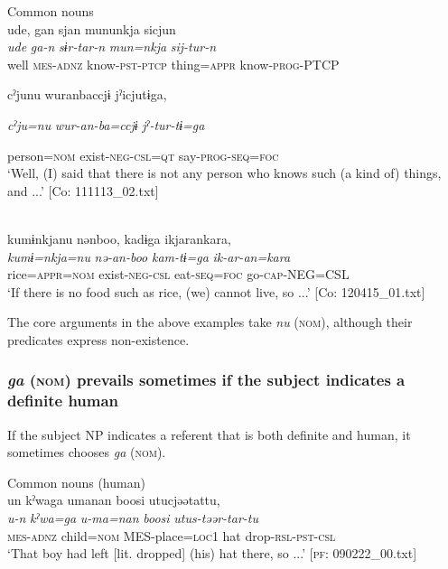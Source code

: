 \begin{table}
\begin{styleBeschriftung}
\ea\label{ex:6-131}
 Common nouns\\

 \ea {\TM}  ude,  gan  sjan  mununkja  sicjun\\
\glll \textit{ude}  \textit{ga-n}  \textit{sɨr-tar-n}  \textit{mun=nkja}  \textit{sij-tur-n}\\
well  \textsc{mes}-\textsc{adnz}  know-\textsc{pst}-\textsc{ptcp}  thing=\textsc{appr}  know-\textsc{prog}-PTCP

      cˀjunu  wuranbaccjɨ  jˀicjutɨga,

      \textit{cˀju=nu}  \textit{wur-an-ba=ccjɨ}  \textit{jˀ-tur-tɨ=ga}

      person=\textsc{nom}  exist-\textsc{neg}-\textsc{csl}=\textsc{qt}  say-\textsc{prog}-\textsc{seq}=\textsc{foc}\\
\glt ‘Well, (I) said that there is not any person who knows such (a kind of) things, and ...’ [Co: 111113\_02.txt]
\z

\ex\relax[= (\ref{ex:6-48}a)]\\
{\TM}
\glll  kumɨnkjanu  nənboo,  kadɨga  ikjarankara,\\
\textit{kumɨ=nkja=nu}  \textit{nə-an-boo}  \textit{kam-tɨ=ga}  \textit{ik-ar-an=kara}\\
rice=\textsc{appr}=\textsc{nom}  exist-\textsc{neg}-\textsc{csl}  eat-\textsc{seq}=\textsc{foc}  go-\textsc{cap}-NEG=CSL\\
\glt ‘If there is no food such as rice, (we) cannot live, so ...’ [Co: 120415\_01.txt]
\z

The core arguments in the above examples take \textit{nu} (\textsc{nom}), although their predicates express non-existence.

\subsubsection{\textit{ga} (\textsc{nom}) prevails sometimes if the subject indicates a definite human}

If the subject NP indicates a referent that is both definite and human, it sometimes chooses \textit{ga} (\textsc{nom}).

\ea\label{ex:6-132}
 Common nouns (human)\\

 \ea {\TM}  un  kˀwaga  umanan  {\textbar}boosi{\textbar}  utucjəətattu,\\
\glll \textit{u-n}  \textit{kˀwa=ga}  \textit{u-ma=nan}  \textit{boosi}  \textit{utus-təər-tar-tu}\\
\textsc{mes}-\textsc{adnz}  child=\textsc{nom}  MES-place=\textsc{loc}1  hat  drop-\textsc{rsl}-\textsc{pst}-\textsc{csl}\\
\glt ‘That boy had left [lit. dropped] (his) hat there, so ...’ [\textsc{pf}: 090222\_00.txt]
\z


\end{styleBeschriftung}
\end{table}
